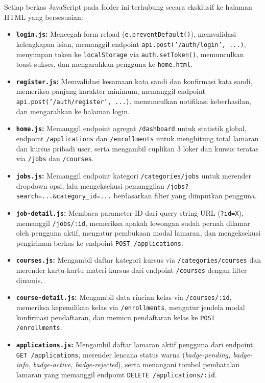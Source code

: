 \documentclass[11pt,a4paper]{article}
\begin{document}
Setiap berkas JavaScript pada folder ini terhubung secara eksklusif ke halaman HTML yang bersesuaian:
\begin{itemize}[leftmargin=*]
    \item \textbf{\texttt{login.js}:} Mencegah form reload (\texttt{e.preventDefault()}), memvalidasi kelengkapan isian, memanggil endpoint \texttt{api.post('/auth/login', ...)}, menyimpan token ke \texttt{localStorage} via \texttt{auth.setToken()}, memunculkan toast sukses, dan mengarahkan pengguna ke \texttt{home.html}.
    \item \textbf{\texttt{register.js}:} Memvalidasi kesamaan kata sandi dan konfirmasi kata sandi, memeriksa panjang karakter minimum, memanggil endpoint \texttt{api.post('/auth/register', ...)}, memunculkan notifikasi keberhasilan, dan mengarahkan ke halaman login.
    \item \textbf{\texttt{home.js}:} Memanggil endpoint agregat \texttt{/dashboard} untuk statistik global, endpoint \texttt{/applications} dan \texttt{/enrollments} untuk menghitung total lamaran dan kursus pribadi user, serta mengambil cuplikan 3 loker dan kursus teratas via \texttt{/jobs} dan \texttt{/courses}.
    \item \textbf{\texttt{jobs.js}:} Memanggil endpoint kategori \texttt{/categories/jobs} untuk merender dropdown opsi, lalu mengeksekusi pemanggilan \texttt{/jobs?search=...\&category\_id=...} berdasarkan filter yang diinputkan pengguna.
    \item \textbf{\texttt{job-detail.js}:} Membaca parameter ID dari query string URL (\texttt{?id=X}), memanggil \texttt{/jobs/:id}, memeriksa apakah lowongan sudah pernah dilamar oleh pengguna aktif, mengatur pembukaan modal lamaran, dan mengeksekusi pengiriman berkas ke endpoint \texttt{POST /applications}.
    \item \textbf{\texttt{courses.js}:} Mengambil daftar kategori kursus via \texttt{/categories/courses} dan merender kartu-kartu materi kursus dari endpoint \texttt{/courses} dengan filter dinamis.
    \item \textbf{\texttt{course-detail.js}:} Mengambil data rincian kelas via \texttt{/courses/:id}, memeriksa kepemilikan kelas via \texttt{/enrollments}, mengatur jendela modal konfirmasi pendaftaran, dan memicu pendaftaran kelas ke \texttt{POST /enrollments}.
    \item \textbf{\texttt{applications.js}:} Mengambil daftar lamaran aktif pengguna dari endpoint \texttt{GET /applications}, merender lencana status warna (\textit{badge-pending, badge-info, badge-active, badge-rejected}), serta menangani tombol pembatalan lamaran yang memanggil endpoint \texttt{DELETE /applications/:id}.

\end{itemize}
\end{document}
